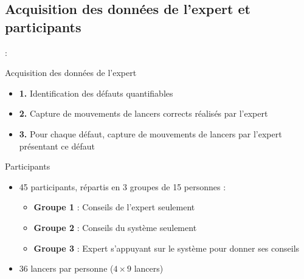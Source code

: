 \documentclass[svgnames]{beamer}
\begin{document}
	\subsection{Acquisition des données de l'expert et participants}
	\begin{frame}{\secname : \subsecname}
		\begin{block}{Acquisition des données de l'expert}
			\begin{itemize}
				\item \textbf{1.} Identification des défauts quantifiables
				\item \textbf{2.} Capture de mouvements de lancers corrects réalisés par l'expert
				\item \textbf{3.} Pour chaque défaut, capture de mouvements de lancers par l'expert présentant ce défaut 
			\end{itemize}
		\end{block}
	
		\begin{block}{Participants}
			\begin{itemize}[label=$\bullet$]
				\item 45 participants, répartis en 3 groupes de 15 personnes :
				\begin{itemize}
					\item \textbf{Groupe 1} : Conseils de l'expert seulement
					\item \textbf{Groupe 2} : Conseils du système seulement
					\item \textbf{Groupe 3} : Expert s'appuyant sur le système pour donner ses conseils
				\end{itemize}
				\item 36 lancers par personne ($4 \times 9$ lancers)
			\end{itemize}
		\end{block}
	\end{frame}
	
\end{document}
